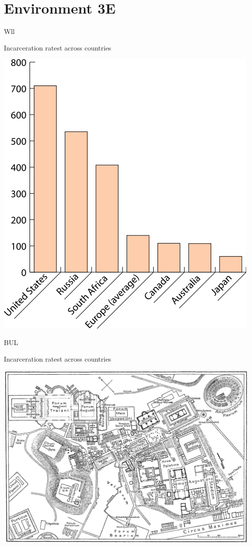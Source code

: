 \section{Environment 3E}

\begin{chart}{W}{ll}
\caption{Incarceration ratest across countries}
\label{chart:incarceration}
\includegraphics[width=\chartwidth,height=\chartheight]{incarceration}  
\end{chart}

\lipsum[1-4]

\begin{map}{B}{UL}
\caption{Incarceration ratest across countries}
\label{chart:incarceration}
\includegraphics[width=\chartwidth,height=\chartheight]{Rome}  
\end{map}
%

